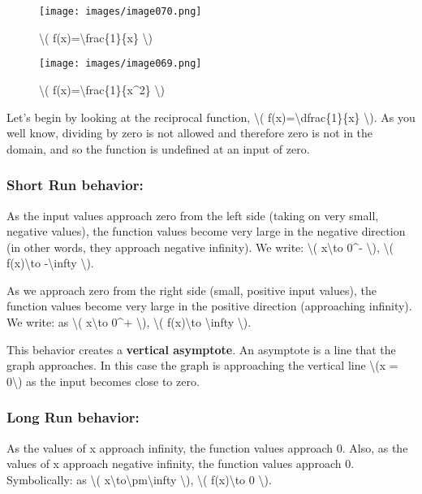 \begin{figure}
\centering
\texttt{[image: images/image070.png]}
\caption{\textbackslash{}( f(x)=\textbackslash{}frac\{1\}\{x\}
\textbackslash{})}
\end{figure}

\begin{figure}
\centering
\texttt{[image: images/image069.png]}
\caption{\textbackslash{}( f(x)=\textbackslash{}frac\{1\}\{x\^{}2\}
\textbackslash{})}
\end{figure}

Let's begin by looking at the reciprocal function, \textbackslash{}(
f(x)=\textbackslash{}dfrac\{1\}\{x\} \textbackslash{}). As you well
know, dividing by zero is not allowed and therefore zero is not in the
domain, and so the function is undefined at an input of zero.

\hypertarget{short-run-behavior}{%
\subsubsection{Short Run behavior:}\label{short-run-behavior}}

As the input values approach zero from the left side (taking on very
small, negative values), the function values become very large in the
negative direction (in other words, they approach negative infinity). We
write: \textbackslash{}( x\textbackslash{}to 0\^{}- \textbackslash{}),
\textbackslash{}( f(x)\textbackslash{}to -\textbackslash{}infty
\textbackslash{}).

As we approach zero from the right side (small, positive input values),
the function values become very large in the positive direction
(approaching infinity). We write: as \textbackslash{}(
x\textbackslash{}to 0\^{}+ \textbackslash{}), \textbackslash{}(
f(x)\textbackslash{}to \textbackslash{}infty \textbackslash{}).

This behavior creates a \textbf{vertical asymptote}. An asymptote is a
line that the graph approaches. In this case the graph is approaching
the vertical line \textbackslash{}(x = 0\textbackslash{}) as the input
becomes close to zero.

\hypertarget{long-run-behavior}{%
\subsubsection{Long Run behavior:}\label{long-run-behavior}}

As the values of x approach infinity, the function values approach 0.
Also, as the values of x approach negative infinity, the function values
approach 0. Symbolically: as \textbackslash{}(
x\textbackslash{}to\textbackslash{}pm\textbackslash{}infty
\textbackslash{}), \textbackslash{}( f(x)\textbackslash{}to 0
\textbackslash{}).

